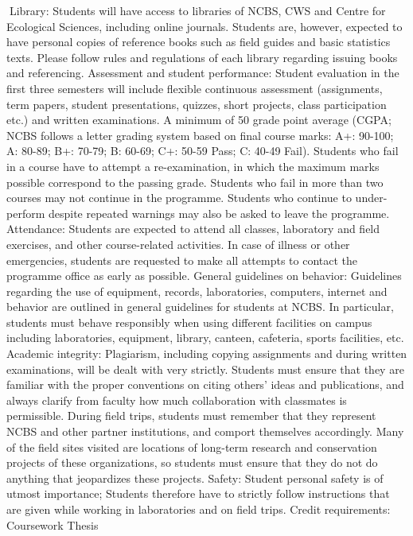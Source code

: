 \documentclass[a4paper,10pt]{article}
\begin{document}
Library: Students will have access to libraries of NCBS, CWS and Centre for Ecological
Sciences, including online journals. Students are, however, expected to have personal copies
of reference books such as field guides and basic statistics texts. Please follow rules and
regulations of each library regarding issuing books and referencing.
Assessment and student performance: Student evaluation in the first three semesters will
include flexible continuous assessment (assignments, term papers, student presentations,
quizzes, short projects, class participation etc.) and written examinations. A minimum of
50%
grade point average (CGPA; NCBS follows a letter grading system based on final course
marks: A+: 90-100; A: 80-89; B+: 70-79; B: 60-69; C+: 50-59 Pass; C: 40-49 Fail).
Students who fail in a course have to attempt a re-examination, in which the maximum
marks possible correspond to the passing grade. Students who fail in more than two courses
may not continue in the programme. Students who continue to under-perform despite
repeated warnings may also be asked to leave the programme.
Attendance: Students are expected to attend all classes, laboratory and field exercises, and
other course-related activities. In case of illness or other emergencies, students are requested
to make all attempts to contact the programme office as early as possible.
General guidelines on behavior: Guidelines regarding the use of equipment, records,
laboratories, computers, internet and behavior are outlined in general guidelines for students
at NCBS. In particular, students must behave responsibly when using different facilities on
campus including laboratories, equipment, library, canteen, cafeteria, sports facilities, etc.
Academic integrity: Plagiarism, including copying assignments and during written
examinations, will be dealt with very strictly. Students must ensure that they are familiar
with the proper conventions on citing others’ ideas and publications, and always clarify from
faculty how much collaboration with classmates is permissible. During field trips, students
must remember that they represent NCBS and other partner institutions, and comport
themselves accordingly. Many of the field sites visited are locations of long-term research
and conservation projects of these organizations, so students must ensure that they do not do
anything that jeopardizes these projects.
Safety: Student personal safety is of utmost importance; Students therefore have to strictly
follow instructions that are given while working in laboratories and on field trips.
Credit requirements:
Coursework
Thesis
\end{document}
